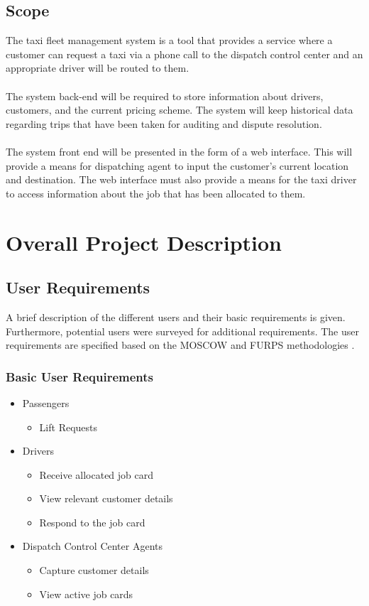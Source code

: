 \documentclass[10pt,twocolumn]{witseiepaper}
\begin{document}
\subsection{Scope}

The taxi fleet management system is a tool that provides a service where a customer can request a taxi via a phone call to the dispatch control center and an appropriate driver will be routed to them.\\\\
The system back-end will be required to store information about drivers, customers, and the current pricing scheme. The system will keep historical data regarding trips that have been taken for auditing and dispute resolution.\\\\
The system front end will be presented in the form of a web interface. This will provide a means for dispatching agent to input the customer's current location and destination. The web interface must also provide a means for the taxi driver to access information about the job that has been allocated to them.

\section{Overall Project Description}

\subsection{User Requirements}
A brief description of the different users and their basic requirements is given. Furthermore, potential users were surveyed for additional requirements. The user requirements are specified based on the MOSCOW and FURPS methodologies \cite{SoftwareEngTextbook}.

\subsubsection{Basic User Requirements}
\begin{itemize}
\item Passengers
\begin{itemize}
\item Lift Requests 
\end{itemize}

\item Drivers
\begin{itemize}
\item Receive allocated job card
\item View relevant customer details
\item Respond to the job card 
\end{itemize}

\item Dispatch Control Center Agents
\begin{itemize}
\item Capture customer details
\item View active job cards
\end{itemize}
\end{itemize}
\end{document}
